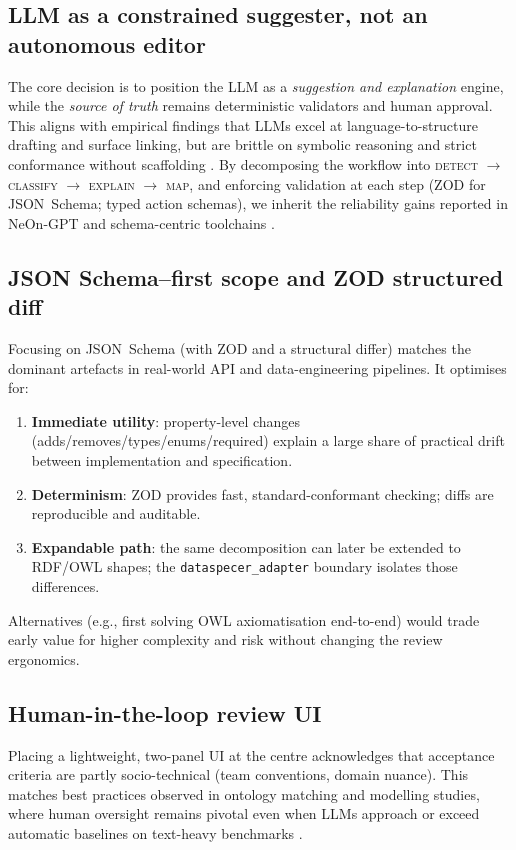 \subsection*{LLM as a constrained suggester, not an autonomous editor}
The core decision is to position the LLM as a \emph{suggestion and explanation} engine, while the \emph{source of truth} remains deterministic validators and human approval. This aligns with empirical findings that LLMs excel at language-to-structure drafting and surface linking, but are brittle on symbolic reasoning and strict conformance without scaffolding \cite{allen2024classmembership,zhang2025ontourl}. By decomposing the workflow into \textsc{detect} $\rightarrow$ \textsc{classify} $\rightarrow$ \textsc{explain} $\rightarrow$ \textsc{map}, and enforcing validation at each step (ZOD for JSON~Schema; typed action schemas), we inherit the reliability gains reported in NeOn-GPT and schema-centric toolchains \cite{fathallah2024neongpt,neubauer2025jsonschema}.

\subsection*{JSON Schema–first scope and ZOD structured diff}
Focusing on JSON~Schema (with ZOD and a structural differ) matches the dominant artefacts in real-world API and data-engineering pipelines. It optimises for:
\begin{enumerate}
  \item \textbf{Immediate utility}: property-level changes (adds/removes/types/enums/required) explain a large share of practical drift between implementation and specification.
  \item \textbf{Determinism}: ZOD provides fast, standard-conformant checking; diffs are reproducible and auditable.
  \item \textbf{Expandable path}: the same decomposition can later be extended to RDF/OWL shapes; the \texttt{dataspecer\_adapter} boundary isolates those differences.
\end{enumerate}
Alternatives (e.g., first solving OWL axiomatisation end-to-end) would trade early value for higher complexity and risk without changing the review ergonomics.

\subsection*{Human-in-the-loop review UI}
Placing a lightweight, two-panel UI at the centre acknowledges that acceptance criteria are partly socio-technical (team conventions, domain nuance). This matches best practices observed in ontology matching and modelling studies, where human oversight remains pivotal even when LLMs approach or exceed automatic baselines on text-heavy benchmarks \cite{giglou2024llms4om}.

